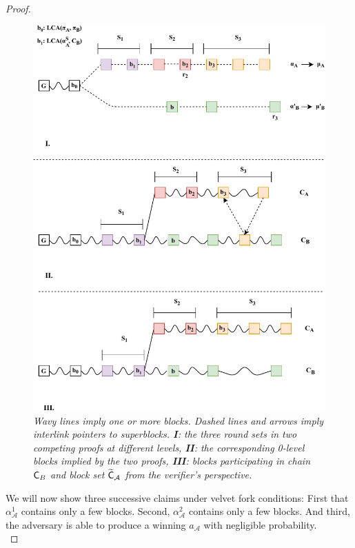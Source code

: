 \begin{proof}
\begin{figure}[h!]
	\begin{center}
    \includegraphics[scale=0.65]{figures/proof_velvet-crop.pdf}
	\end{center}
	\caption{\textit{ Wavy lines imply one or more blocks. Dashed lines and arrows imply interlink pointers to superblocks. \textbf{I}: the three round sets in two competing proofs at different levels, \textbf{II}: the corresponding 0-level blocks implied by the two proofs, \textbf{III}: blocks participating in chain $\mathsf{C}_B$ and block set $\widetilde{\mathsf{C}}_\mathcal{A}$ from the verifier's perspective.}}
    \label{fig:proof_velvet}
\end{figure}

We will now show three successive claims under velvet fork conditions: First that $\alpha_\mathcal{A}^1$ contains only a few blocks. Second,  $\alpha_\mathcal{A}^2$ contains only a few blocks. And third, the adversary is able to produce a winning $a_\mathcal{A}$ with negligible probability.\\


\end{proof}
